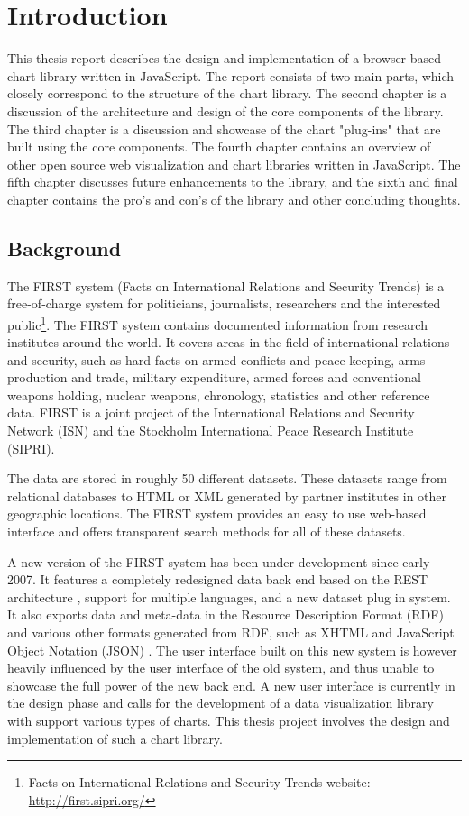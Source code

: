
\chapter{Introduction}
This thesis report describes the design and implementation of a browser-based chart library written in JavaScript. The report consists of two main parts, which closely correspond to the structure of the chart library. The second chapter is a discussion of the architecture and design of the core components of the library. The third chapter is a discussion and showcase of the chart "plug-ins" that are built using the core components. The fourth chapter contains an overview of other open source web visualization and chart libraries written in JavaScript. The fifth chapter discusses future enhancements to the library, and the sixth and final chapter contains the pro's and con's of the library and other concluding thoughts.

\section{Background}
The FIRST system (Facts on International Relations and Security Trends) is a free-of-charge system for politicians, journalists, researchers and the interested public\footnote{Facts on International Relations and Security Trends website: \url{http://first.sipri.org/}}. The FIRST system contains documented information from research institutes around the world. It covers areas in the field of international relations and security, such as hard facts on armed conflicts and peace keeping, arms production and trade, military expenditure, armed forces and conventional weapons holding, nuclear weapons, chronology, statistics and other reference data. FIRST is a joint project of the International Relations and Security Network (ISN) and the Stockholm International Peace Research Institute (SIPRI).

The data are stored in roughly 50 different datasets. These datasets range from relational databases to HTML or XML generated by partner institutes in other geographic locations. The FIRST system provides an easy to use web-based interface and offers transparent search methods for all of these datasets.

A new version of the FIRST system has been under development since early 2007. It features a completely redesigned data back end based on the REST architecture \cite{fielding00}, support for multiple languages, and a new dataset plug in system. It also exports data and meta-data in the Resource Description Format (RDF) \cite{rdf04} and various other formats generated from RDF, such as XHTML and JavaScript Object Notation (JSON) \cite{crockford06}. The user interface built on this new system is however heavily influenced by the user interface of the old system, and thus unable to showcase the full power of the new back end. A new user interface is currently in the design phase and calls for the development of a data visualization library with support various types of charts. This thesis project involves the design and implementation of such a chart library.

